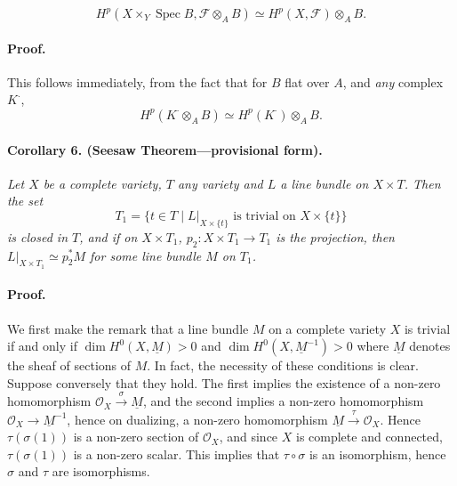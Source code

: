 

\DeclareMathOperator{\Spec}{Spec}


\[
  H^p(X \times_Y \Spec B, \mathscr{F} \otimes_A B) \simeq
  H^p(X, \mathscr{F}) \otimes_A B.
\]

\paragraph{Proof.}
This follows immediately, from the fact that for $B$ flat over $A$, and
\textit{any} complex $K^{\cdot}$,
\[
  H^p(K^{\cdot} \otimes_A B) \simeq H^p(K^{\cdot}) \otimes_A B.
\]

\paragraph{Corollary 6. (Seesaw Theorem---provisional form).}
\textit{Let $X$ be a complete variety, $T$ any variety and $L$ a line bundle
on $X \times T$. Then the set}
\[
  T_1 = \{ t \in T \mid L|_{X \times \{t\}} \text{ is trivial on } X \times \{t\} \}
\]
\textit{is closed in $T$, and if on $X \times T_1$,
$p_2 : X \times T_1 \to T_1$ is the projection, then
$L|_{X \times T_1} \simeq p_2^* M$ for some line bundle $M$ on $T_1$.}

\paragraph{Proof.}
We first make the remark that a line bundle $M$ on a complete variety $X$ is
trivial if and only if $\dim H^0(X, \underline{M}) > 0$ and
$\dim H^0(X, \underline{M}^{-1}) > 0$ where $\underline{M}$ denotes the sheaf
of sections of $M$. In fact, the necessity of these conditions is clear.
Suppose conversely that they hold. The first implies the existence of a
non-zero homomorphism $\mathcal{O}_X \xrightarrow{\ \sigma\ } \underline{M}$,
and the second implies a non-zero homomorphism
$\mathcal{O}_X \to \underline{M}^{-1}$, hence on dualizing, a non-zero
homomorphism $\underline{M} \xrightarrow{\ \tau\ } \mathcal{O}_X$. Hence
$\tau(\sigma(1))$ is a non-zero section of $\mathcal{O}_X$, and since $X$ is
complete and connected, $\tau(\sigma(1))$ is a non-zero scalar. This implies
that $\tau \circ \sigma$ is an isomorphism, hence $\sigma$ and $\tau$ are
isomorphisms.

